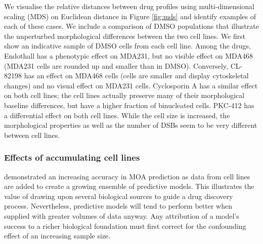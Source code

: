 We visualise the relative distances between drug profiles using multi-dimensional scaling (MDS) on Euclidean distance in Figure \ref{fig:mds} and identify examples of each of these cases. We include a comparison of DMSO populations that illustrate the unperturbed morphological differences between the two cell lines. We first show an indicative sample of DMSO cells from each cell line. Among the drugs, Endothall has a phenotypic effect on MDA231, but no visible effect on MDA468 (MDA231 cells are rounded up and smaller than in DMSO). Conversely, CL-82198 has an effect on MDA468 cells (cells are smaller and display cytoskeletal changes) and no visual effect on MDA231 cells. Cyclosporin A has a similar effect on both cell lines; the cell lines actually preserve many of their morphological baseline differences, but have a higher fraction of binucleated cells. PKC-412 has a differential effect on both cell lines. While the cell size is increased, the morphological properties as well as the number of DSBs seem to be very different between cell lines.


\subsubsection{Effects of accumulating cell lines}
\label{subsubsec:accumulating}

\cite{rose2018compound} demonstrated an increasing accuracy in MOA prediction as data from cell lines are added to create a growing ensemble of predictive models. This illustrates the value of drawing upon several biological sources to guide a drug discovery process. Nevertheless, predictive models will tend to perform better when supplied with greater volumes of data anyway. Any attribution of a model's success to a richer biological foundation must first correct for the confounding effect of an increasing sample size.

